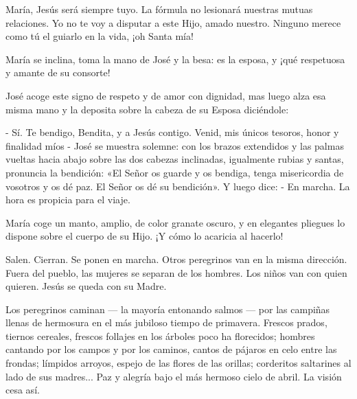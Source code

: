 \documentclass[12pt]{book} %
\begin{document}
María, Jesús será siempre tuyo. La fórmula no lesionará nuestras mutuas relaciones. Yo no te voy a disputar a este Hijo, amado nuestro. Ninguno merece como tú el guiarlo en la vida, ¡oh Santa mía! 

María se inclina, toma la mano de José y la besa: es la esposa, y ¡qué respetuosa y amante de su consorte! 

José acoge este signo de respeto y de amor con dignidad, mas luego alza esa misma mano y la deposita sobre la cabeza de su Esposa diciéndole: 

- Sí. Te bendigo, Bendita, y a Jesús contigo. Venid, mis únicos tesoros, honor y finalidad míos - José se muestra solemne: con los brazos extendidos y las palmas vueltas hacia abajo sobre las dos cabezas inclinadas, igualmente rubias y santas, pronuncia la bendición: «El Señor os guarde y os bendiga, tenga misericordia de vosotros y os dé paz. El Señor os dé su bendición». Y luego dice: - En marcha. La hora es propicia para el viaje. 

María coge un manto, amplio, de color granate oscuro, y en elegantes pliegues lo dispone sobre el cuerpo de su Hijo. ¡Y cómo lo acaricia al hacerlo! 

Salen. Cierran. Se ponen en marcha. Otros peregrinos van en la misma dirección. Fuera del pueblo, las mujeres se separan de los hombres. Los niños van con quien quieren. Jesús se queda con su Madre. 

Los peregrinos caminan — la mayoría entonando salmos — por las campiñas llenas de hermosura en el más jubiloso tiempo de primavera. Frescos prados, tiernos cereales, frescos follajes en los árboles poco ha florecidos; hombres cantando por los campos y por los caminos, cantos de pájaros en celo entre las frondas; límpidos arroyos, espejo de las flores de las orillas; corderitos saltarines al lado de sus madres... Paz y alegría bajo el más hermoso cielo de abril. La visión cesa así. 

\tableofcontents
\end{document}
